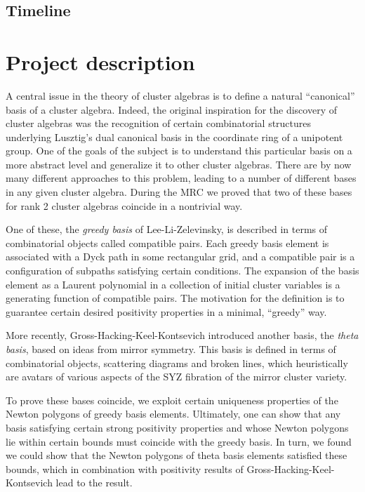 \documentclass{amsart}
\begin{document}
  \subsection*{Timeline}

  \section*{Project description}

    A central issue in the theory of cluster algebras is to define a natural
    ``canonical'' basis of a cluster algebra.
    Indeed, the original inspiration for the discovery of cluster algebras was
    the recognition of certain combinatorial structures underlying Lusztig's
    dual canonical basis in the coordinate ring of a unipotent group.
    One of the goals of the subject is to understand this particular basis on a
    more abstract level and generalize it to other cluster algebras.
    There are by now many different approaches to this problem, leading to a
    number of different bases in any given cluster algebra.
    During the MRC we proved that two of these bases for rank 2 cluster algebras coincide in a nontrivial
    way.

    One of these, the \emph{greedy basis} of Lee-Li-Zelevinsky, is described in
    terms of combinatorial objects called compatible pairs.
    Each greedy basis element is associated with a Dyck path in some rectangular
    grid, and a compatible pair is a configuration of subpaths satisfying
    certain conditions.
    The expansion of the basis element as a Laurent polynomial in a collection
    of initial cluster variables is a generating function of compatible pairs.
    The motivation for the definition is to guarantee certain desired positivity
    properties in a minimal, ``greedy'' way.

    More recently, Gross-Hacking-Keel-Kontsevich introduced another basis, the
    \emph{theta basis}, based on ideas from mirror symmetry.
    This basis is defined in terms of combinatorial objects, scattering diagrams
    and broken lines, which heuristically are avatars of various aspects of the
    SYZ fibration of the mirror cluster variety.
    
    To prove these bases coincide, we exploit certain uniqueness properties of
    the Newton polygons of greedy basis elements.
    Ultimately, one can show that any basis satisfying certain strong positivity
    properties and whose Newton polygons lie within certain bounds must coincide
    with the greedy basis.
    In turn, we found we could show that the Newton polygons of theta basis
    elements satisfied these bounds, which in combination with positivity
    results of Gross-Hacking-Keel-Kontsevich lead to the result.
    
\end{document}
